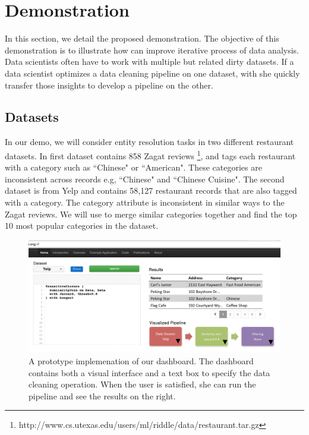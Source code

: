 \section{Demonstration}
In this section, we detail the proposed demonstration.
The objective of this demonstration is to illustrate 
how \sys can improve iterative process of data analysis.
Data scientists often have to work with multiple but related dirty datasets.
If a data scientist optimizes a data cleaning pipeline on one dataset, with \sys 
she quickly transfer those insights to develop a pipeline on the other.

\subsection{Datasets}
In our demo, we will consider entity resolution tasks in two different restaurant datasets.
In first dataset contains 858 Zagat reviews \footnote{http://www.cs.utexas.edu/users/ml/riddle/data/restaurant.tar.gz},
and tags each restaurant with a category such as ``Chinese" or ``American".
These categories are inconsistent across records e.g, ``Chinese" and ``Chinese Cuisine".
The second dataset is from Yelp and contains 58,127 restaurant records that are also tagged with a category.
The category attribute is inconsistent in similar ways to the Zagat reviews.
We will use \sys to merge similar categories together and find the top 10 most popular categories in the dataset.

\begin{figure}[t]
\centering
 \includegraphics[width=\columnwidth]{figs/dashboard_screenshot.png}
 \caption{A prototype implemenation of our \sys dashboard. The dashboard contains both a visual interface and a text box to specify the data cleaning operation. When the user is satisfied, she can run the pipeline and see the results on the right. \label{screenshot}}\vspace{-1.75em}
\end{figure}

